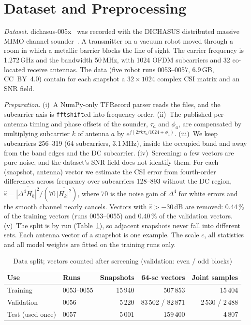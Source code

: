 \documentclass[conference]{IEEEtran}
\begin{document}
\section{Dataset and Preprocessing}
\label{sec:data}
\emph{Dataset.} dichasus-005x~\cite{euchner2021data} was recorded with the DICHASUS distributed massive
MIMO channel sounder~\cite{euchner2021sounder}. A transmitter on a vacuum robot moved through a room in
which a metallic barrier blocks the line of sight. The carrier frequency is 1.272\,GHz and the bandwidth
50\,MHz, with 1024 OFDM subcarriers and 32 co-located receive antennas. The data (five robot runs 0053--0057, 6.9\,GB, CC~BY~4.0) contain
for each snapshot a $32\times1024$ complex CSI matrix and an SNR field.

\emph{Preparation.} (i)~A NumPy-only TFRecord parser reads the files, and the subcarrier axis is
\texttt{fftshift}ed into frequency order. (ii)~The published per-antenna timing and phase offsets of the
sounder, $\tau_a$ and $\phi_a$, are compensated by multiplying subcarrier $k$ of antenna $a$ by
$e^{j(2\pi k\tau_a/1024+\phi_a)}$. (iii)~We keep subcarriers 256--319 (64 subcarriers, 3.1\,MHz), inside
the occupied band and away from the band edges and the DC subcarrier. (iv)~Screening: a few vectors are
pure noise, and the dataset's SNR field does not identify them. For each (snapshot, antenna) vector we
estimate the CSI error from fourth-order differences across frequency over subcarriers 128--893 without
the DC region, $\hat\varepsilon=\overline{|\Delta^4H_k|^2}/(70\,\overline{|H_k|^2})$, where 70 is the noise gain of
$\Delta^4$ for white errors and the smooth channel nearly cancels. Vectors with $\hat\varepsilon>-30$\,dB
are removed: 0.44\,\% of the training vectors (runs 0053--0055) and 0.40\,\% of the validation vectors. (v)~The split is by run
(Table~\ref{tab:data}), so adjacent snapshots never fall into different sets. Each antenna vector of a
snapshot is one example. The scale $c$, all statistics and all model weights are fitted on the training
runs only.

\begin{table}[t]
\caption{Data split; vectors counted after screening (validation: even / odd blocks)}
\label{tab:data}
\centering\footnotesize
\setlength{\tabcolsep}{3.5pt}
\begin{tabular}{@{}llrrr@{}}
\toprule
Use & Runs & Snapshots & 64-sc vectors & Joint samples\\
\midrule
Training & 0053--0055 & 15\,940 & 507\,853 & 15\,404\\
Validation & 0056 & 5\,220 & 83\,502 / 82\,871 & 2\,530 / 2\,488\\
Test (used once) & 0057 & 5\,001 & 159\,400 & 4\,807\\
\bottomrule
\end{tabular}
\end{table}
\end{document}
